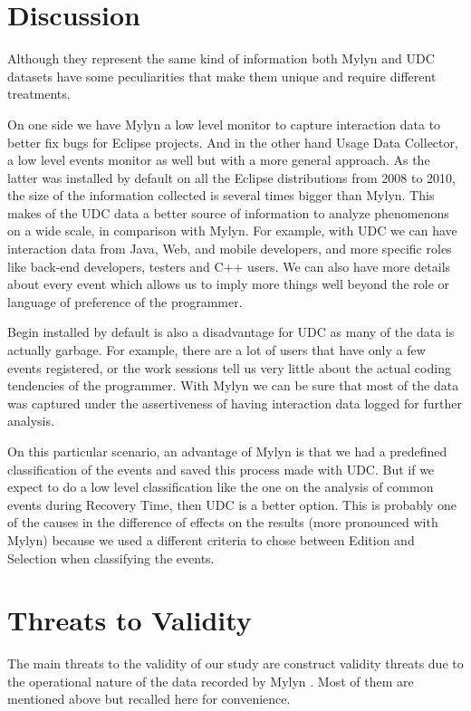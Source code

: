 \documentclass[times]{smrauth}
\begin{document}
\section{Discussion}
Although they represent the same kind of information both Mylyn and UDC datasets have some peculiarities that make them unique and require different treatments. 

On one side we have Mylyn a low level monitor to capture interaction data to better fix bugs for Eclipse projects. And in the other hand Usage Data Collector, a low level events monitor as well but with a more general approach. As the latter was installed by default on all the Eclipse distributions from 2008 to 2010, the size of the information collected is several times bigger than Mylyn. This makes of the UDC data a better source of information to analyze phenomenons on a wide scale, in comparison with Mylyn. For example, with UDC we can have interaction data from Java, Web, and mobile developers, and more specific roles like back-end developers, testers and C++ users. We can also have more details about every event which allows us to imply more things well beyond the role or language of preference of the programmer.

Begin installed by default is also a disadvantage for UDC as many of the data is actually garbage. For example, there are a lot of users that have only a few events registered, or the work sessions tell us very little about the actual coding tendencies of the programmer. With Mylyn we can be sure that most of the data was captured under the assertiveness of having interaction data logged for further analysis.

On this particular scenario, an advantage of Mylyn is that we had a predefined classification of the events and saved this process made with UDC. But if we expect to do a low level classification like the one on the analysis of common events during Recovery Time, then UDC is a better option. This is probably one of the causes in the difference of effects on the results (more pronounced with Mylyn) because we used a different criteria to chose between Edition and Selection when classifying the events.

\section{Threats to Validity}
The main threats to the validity of our study are construct validity threats due to the operational nature of the data recorded by Mylyn \cite{M14}. Most of them are mentioned above but recalled here for convenience.
\end{document}
